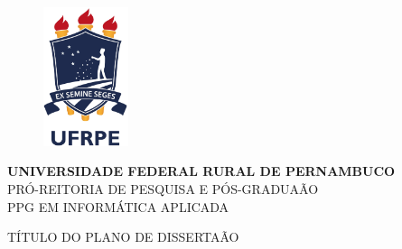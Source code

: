 \begin{titlepage}
\begin{figure}[t]
\centering
    \includegraphics[width=2.5cm]{prefacios/capa/figuras/ufrpe}\\
	\label{fig:pdsmodel}
\end{figure}


\begin{center}
\vspace{1.0truecm}
\large{\textbf{UNIVERSIDADE FEDERAL RURAL DE PERNAMBUCO}}\\
\large{PR\'{O}-REITORIA DE PESQUISA E P\'{O}S-GRADUA\~{A}O}\\
\large{PPG EM INFORM\'{A}TICA APLICADA}
\end{center}


\begin{center}
\vspace{5truecm}
\large{{T\'{I}TULO DO PLANO DE DISSERTA\~{A}O}}
\end{center}

\vspace{5.0truecm}

\begin{center}
\vspace{3truecm}
\end{center}

\end{titlepage}
\pagebreak
